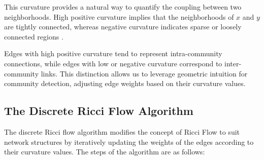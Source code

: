 \documentclass[12pt,a4paper]{article}
\begin{document}
This curvature provides a natural way to quantify the coupling between two neighborhoods. High positive curvature implies that the neighborhoods of $x$ and $y$ are tightly connected, whereas negative curvature indicates sparse or loosely connected regions \cite{communitydetectionnetworksricci}.

Edges with high positive curvature tend to represent intra-community connections, while edges with low or negative curvature correspond to inter-community links. This distinction allows us to leverage geometric intuition for community detection, adjusting edge weights based on their curvature values.




\subsection{The Discrete Ricci Flow Algorithm}
The discrete Ricci flow algorithm modifies the concept of Ricci Flow to suit network structures by iteratively updating the weights of the edges according to their curvature values. The steps of the algorithm are as follows:
\end{document}
